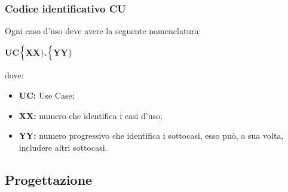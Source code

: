 \subsubsection{Codice identificativo CU}
Ogni caso d'uso deve avere la seguente nomenclatura:
\begin{center}
	\textbf{UC$\Bigl\{$XX$\Bigr\}$.$\Bigl\{$YY$\Bigr\}$}
\end{center}
dove:
\begin{itemize}
	\item \textbf{UC:} Use Case;
	\item \textbf{{XX}:} numero che identifica i casi d'uso;
	\item \textbf{{YY}:} numero progressivo che identifica i sottocasi, esso può, a sua volta, includere altri sottocasi.
\end{itemize}






\subsection{Progettazione}
